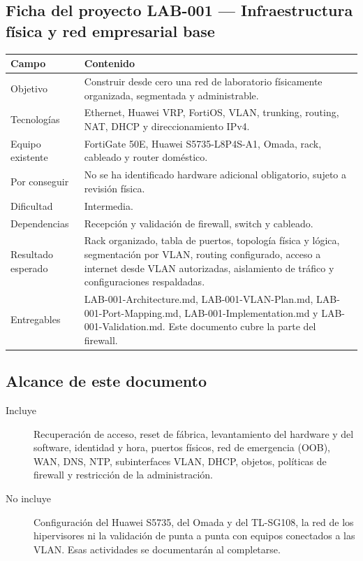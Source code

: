 \documentclass[11pt,a4paper]{article}
\begin{document}
\subsection*{Ficha del proyecto LAB-001 --- Infraestructura física y red empresarial base}
{\small\noindent
\begin{tabularx}{\linewidth}{@{}P{4.2cm}Y@{}}
\toprule
{}\textbf{Campo} & \textbf{Contenido}\\\midrule
Objetivo & Construir desde cero una red de laboratorio físicamente organizada, segmentada y administrable. \\
Tecnologías & Ethernet, Huawei VRP, FortiOS, VLAN, trunking, routing, NAT, DHCP y direccionamiento IPv4. \\
Equipo existente & FortiGate 50E, Huawei S5735-L8P4S-A1, Omada, rack, cableado y router doméstico. \\
Por conseguir & No se ha identificado hardware adicional obligatorio, sujeto a revisión física. \\
Dificultad & Intermedia. \\
Dependencias & Recepción y validación de firewall, switch y cableado. \\
Resultado esperado & Rack organizado, tabla de puertos, topología física y lógica, segmentación por VLAN, routing configurado, acceso a internet desde VLAN autorizadas, aislamiento de tráfico y configuraciones respaldadas. \\
Entregables & LAB-001-Architecture.md, LAB-001-VLAN-Plan.md, LAB-001-Port-Mapping.md, LAB-001-Implementation.md y LAB-001-Validation.md. Este documento cubre la parte del firewall. \\
\bottomrule
\end{tabularx}\par}

\subsection{Alcance de este documento}

\begin{description}
  \item[Incluye] Recuperación de acceso, reset de fábrica, levantamiento del hardware y del software, identidad y hora, puertos físicos, red de emergencia (OOB), WAN, DNS, NTP, subinterfaces VLAN, DHCP, objetos, políticas de firewall y restricción de la administración.
  \item[No incluye] Configuración del Huawei S5735, del Omada y del TL-SG108, la red de los hipervisores ni la validación de punta a punta con equipos conectados a las VLAN. Esas actividades se documentarán al completarse.
\end{description}
\end{document}
